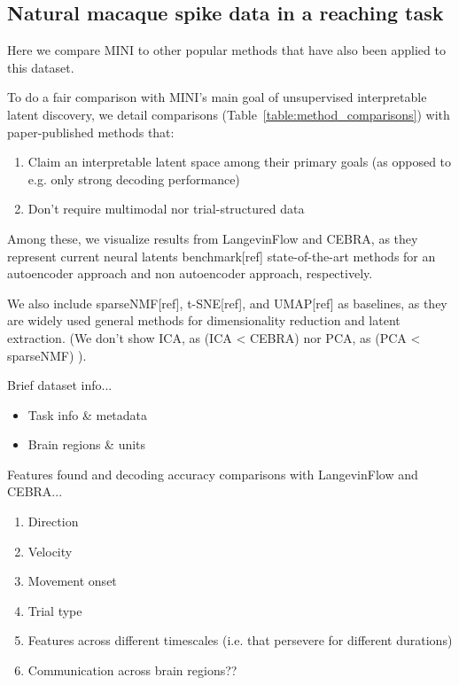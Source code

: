 \subsection{Natural macaque spike data in a reaching task}

Here we compare MINI to other popular methods that have also been applied to this dataset.

To do a fair comparison with MINI's main goal of unsupervised interpretable latent discovery, we detail comparisons (Table~\ref{table:method_comparisons}) with paper-published methods that:

\begin{enumerate}
\item Claim an interpretable latent space among their primary goals (as opposed to e.g. only strong decoding performance)
\item Don't require multimodal nor trial-structured data
\end{enumerate}
    
Among these, we visualize results from LangevinFlow and CEBRA, as they represent current neural latents benchmark[ref] state-of-the-art methods for an autoencoder approach and non autoencoder approach, respectively. 

We also include sparseNMF[ref], t-SNE[ref], and UMAP[ref] as baselines, as they are widely used general methods for dimensionality reduction and latent extraction.
(We don't show ICA, as (ICA < CEBRA) nor PCA, as (PCA < sparseNMF) ).

Brief dataset info...
\begin{itemize}
    \item Task info \& metadata
    \item Brain regions \& units
\end{itemize}

Features found and decoding accuracy comparisons with LangevinFlow and CEBRA...
\begin{enumerate}
    \item Direction
    \item Velocity
    \item Movement onset
    \item Trial type
    \item Features across different timescales (i.e. that persevere for different durations)
    \item Communication across brain regions??
\end{enumerate}

